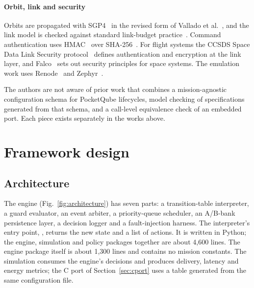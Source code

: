 \documentclass[preprint,12pt]{elsarticle}
\begin{document}
\paragraph{Orbit, link and security} Orbits are propagated with SGP4~\cite{Hoots1980STR3} in the revised form of Vallado et al.~\cite{Vallado2006SGP4}, and the link model is checked against standard link-budget practice~\cite{Maral2009SatCom}. Command authentication uses HMAC~\cite{Bellare1996HMAC,RFC2104} over SHA-256~\cite{NIST2015SHS}. For flight systems the CCSDS Space Data Link Security protocol~\cite{CCSDS2022SDLS} defines authentication and encryption at the link layer, and Falco~\cite{Falco2019SpaceCyber} sets out security principles for space systems. The emulation work uses Renode~\cite{Renode} and Zephyr~\cite{Zephyr}.

The authors are not aware of prior work that combines a mission-agnostic configuration schema for PocketQube lifecycles, model checking of specifications generated from that schema, and a call-level equivalence check of an embedded port. Each piece exists separately in the works above.

\section{Framework design}\label{sec:design}

\subsection{Architecture}

The engine (Fig.~\ref{fig:architecture}) has seven parts: a transition-table interpreter, a guard evaluator, an event arbiter, a priority-queue scheduler, an A/B-bank persistence layer, a decision logger and a fault-injection harness. The interpreter's entry point, , returns the new state and a list of actions. It is written in Python; the engine, simulation and policy packages together are about 4,600 lines. The engine package itself is about 1,300 lines and contains no mission constants. The simulation consumes the engine's decisions and produces delivery, latency and energy metrics; the C port of Section~\ref{sec:cport} uses a table generated from the same configuration file.
\end{document}

